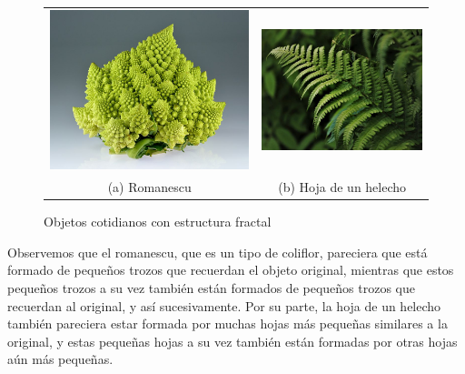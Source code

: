 \documentclass[11pt]{report}
\begin{document}
\begin{figure}[h]
\begin{tabular}{cc}
  \includegraphics[scale=0.24]{./img/romanescu.jpg} &   \includegraphics[scale=0.28]{./img/helecho.jpg} \\
(a) Romanescu & (b) Hoja de un helecho \\[6pt]
\end{tabular}
\caption{Objetos cotidianos con estructura fractal}
\label{fig:objetos}
\end{figure}

Observemos que el romanescu, que es un tipo de coliflor, pareciera que está formado de pequeños trozos que recuerdan el objeto original, mientras que estos pequeños trozos a su vez también están formados de pequeños trozos que recuerdan al original, y así sucesivamente. Por su parte, la hoja de un helecho también pareciera estar formada por muchas hojas más pequeñas similares a la original, y estas pequeñas hojas a su vez también están formadas por otras hojas aún más pequeñas.
\end{document}
